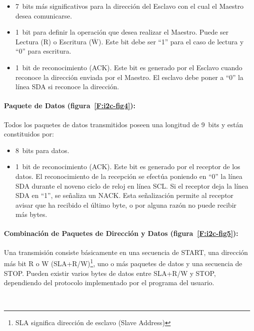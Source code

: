 \begin{itemize}
    \item 7~bits más significativos para la dirección del Esclavo con el cual el Maestro desea comunicarse.
    \item 1~bit para definir la operación que desea realizar el Maestro. Puede ser Lectura (R) o Escritura ($ \overline{\text{W}} $). Este bit debe ser “1” para el caso de lectura y “0” para escritura.
    \item 1~bit de reconocimiento (ACK). Este bit es generado por el Esclavo cuando reconoce la dirección enviada por el Maestro. El esclavo debe poner a “0” la línea SDA si reconoce la dirección.
\end{itemize}

\paragraph{Paquete de Datos (figura~\ref{F:i2c-fig4}):}
Todos los paquetes de datos transmitidos poseen una longitud de 9~bits y están constituidos por:

\begin{itemize}
    \item 8~bits para datos.
    \item 1~bit de reconocimiento (ACK). Este bit es generado por el receptor de los datos. El reconocimiento de la recepción se efectúa poniendo en “0” la línea SDA durante el noveno ciclo de reloj en línea SCL. Si el receptor deja la línea SDA en “1”, se señaliza un NACK. Esta señalización permite al receptor avisar que ha recibido el último byte, o por alguna razón no puede recibir más bytes.
\end{itemize}

\paragraph{Combinación de Paquetes de Dirección y Datos (figura~\ref{F:i2c-fig5}):}
 Una transmisión consiste básicamente en una secuencia de START, una dirección más bit R o W (SLA+R/W)\footnote{SLA significa dirección de esclavo (Slave Address)}, uno o más paquetes de datos y una secuencia de STOP. Pueden existir varios bytes de datos entre SLA+R/W y STOP, dependiendo del protocolo implementado por el programa del usuario.

\vspace{4cm}
~

